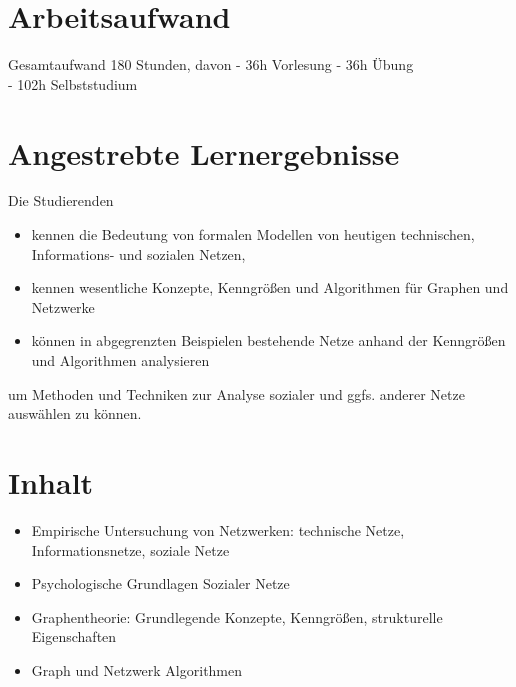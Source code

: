 \section*{Arbeitsaufwand
\label{/mi-2017/modulbeschreibungen-master/MA_SC_Modul_Netzwerk--und-Graphentheorie}}\label{arbeitsaufwand-pathlabelmi-2017modulbeschreibungen-mastermaux5fscux5fmodulux5fnetzwerkund-graphentheorie}

Gesamtaufwand 180 Stunden, davon - 36h Vorlesung - 36h Übung\\
- 102h Selbststudium

\section*{Angestrebte
Lernergebnisse\label{/mi-2017/modulbeschreibungen-master/MA_SC_Modul_Netzwerk--und-Graphentheorie}}\label{angestrebte-lernergebnissepathlabelmi-2017modulbeschreibungen-mastermaux5fscux5fmodulux5fnetzwerkund-graphentheorie}

Die Studierenden

\begin{itemize}
\tightlist
\item
  kennen die Bedeutung von formalen Modellen von heutigen technischen,
  Informations- und sozialen Netzen,
\item
  kennen wesentliche Konzepte, Kenngrößen und Algorithmen für Graphen
  und Netzwerke
\item
  können in abgegrenzten Beispielen bestehende Netze anhand der
  Kenngrößen und Algorithmen analysieren
\end{itemize}

um Methoden und Techniken zur Analyse sozialer und ggfs. anderer Netze
auswählen zu können.

\section*{Inhalt\label{/mi-2017/modulbeschreibungen-master/MA_SC_Modul_Netzwerk--und-Graphentheorie}}\label{inhaltpathlabelmi-2017modulbeschreibungen-mastermaux5fscux5fmodulux5fnetzwerkund-graphentheorie}

\begin{itemize}
\tightlist
\item
  Empirische Untersuchung von Netzwerken: technische Netze,
  Informationsnetze, soziale Netze
\item
  Psychologische Grundlagen Sozialer Netze
\item
  Graphentheorie: Grundlegende Konzepte, Kenngrößen, strukturelle
  Eigenschaften
\item
  Graph und Netzwerk Algorithmen
\end{itemize}

